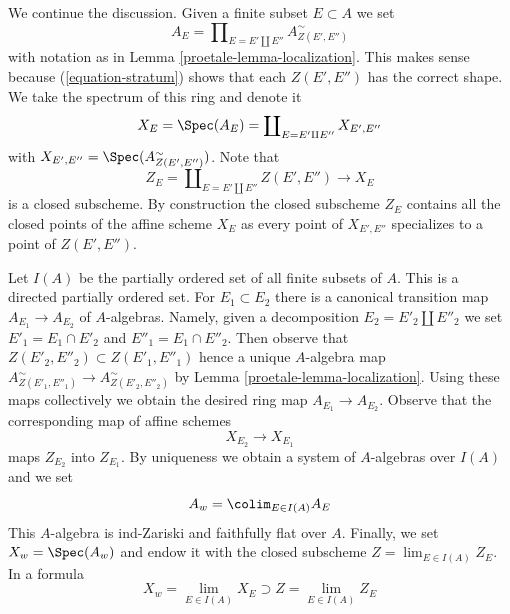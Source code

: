 We continue the discussion.
Given a finite subset $E \subset A$ we set
\begin{equation}
\label{equation-ring}
A_E = \prod\nolimits_{E = E' \amalg E''} A_{Z(E', E'')}^\sim
\end{equation}
with notation as in Lemma \ref{proetale-lemma-localization}. This makes sense because
(\ref{equation-stratum}) shows that each $Z(E', E'')$ has the correct shape.
We take the spectrum of this ring and denote it
\begin{equation}
\label{equation-spectrum}
X_E = \Spec(A_E) = \coprod\nolimits_{E = E' \amalg E''} X_{E', E''}
\end{equation}
with $X_{E', E''} = \Spec(A_{Z(E', E'')}^\sim)$. Note that
\begin{equation}
\label{equation-closed}
Z_E = \coprod\nolimits_{E = E' \amalg E''} Z(E', E'')
\longrightarrow
X_E
\end{equation}
is a closed subscheme. By construction the closed subscheme $Z_E$
contains all the closed points of the affine scheme $X_E$ as every point
of $X_{E', E''}$ specializes to a point of $Z(E', E'')$.

\medskip\noindent
Let $I(A)$ be the partially ordered set of all finite subsets of $A$.
This is a directed partially ordered set. For $E_1 \subset E_2$ there
is a canonical transition map $A_{E_1} \to A_{E_2}$ of $A$-algebras.
Namely, given a decomposition $E_2 = E'_2 \amalg E''_2$ we set
$E'_1 = E_1 \cap E'_2$ and $E''_1 = E_1 \cap E''_2$. Then observe that
$Z(E'_2, E''_2) \subset Z(E'_1, E''_1)$ hence a unique $A$-algebra map
$A_{Z(E'_1, E''_1)}^\sim \to A_{Z(E'_2, E''_2)}^\sim$ by
Lemma \ref{proetale-lemma-localization}. Using these maps collectively we obtain
the desired ring map $A_{E_1} \to A_{E_2}$. Observe that the corresponding
map of affine schemes
\begin{equation}
\label{equation-transition}
X_{E_2} \longrightarrow X_{E_1}
\end{equation}
maps $Z_{E_2}$ into $Z_{E_1}$. By uniqueness we obtain a system of
$A$-algebras over $I(A)$ and we set
\begin{equation}
\label{equation-colimit-ring}
A_w = \colim_{E \in I(A)} A_E
\end{equation}
This $A$-algebra is ind-Zariski and faithfully flat over $A$.
Finally, we set $X_w = \Spec(A_w)$ and endow it with the closed subscheme
$Z = \lim_{E \in I(A)} Z_E$. In a formula
\begin{equation}
\label{equation-final}
X_w = \lim_{E \in I(A)} X_E \supset Z = \lim_{E \in I(A)} Z_E
\end{equation}

